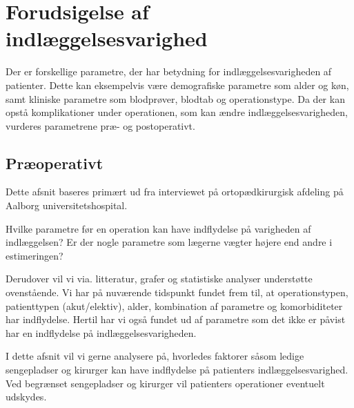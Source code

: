 \section{Forudsigelse af indlæggelsesvarighed}
Der er forskellige parametre, der har betydning for indlæggelsesvarigheden af patienter. Dette kan eksempelvis være demografiske parametre som alder og køn, samt kliniske parametre som blodprøver, blodtab og operationstype. Da der kan opstå komplikationer under operationen, som kan ændre indlæggelsesvarigheden, vurderes parametrene præ- og postoperativt.

\subsection{Præoperativt}

Dette afsnit baseres primært ud fra interviewet på ortopædkirurgisk afdeling på Aalborg universitetshospital. 


Hvilke parametre før en operation kan have indflydelse på varigheden af indlæggelsen? Er der nogle parametre som lægerne vægter højere end andre i estimeringen? 


Derudover vil vi via. litteratur, grafer og statistiske analyser understøtte ovenstående. Vi har på nuværende tidspunkt fundet frem til, at operationstypen, patienttypen (akut/elektiv), alder,  kombination af parametre og komorbiditeter har indflydelse. Hertil har vi også fundet ud af parametre som det ikke er påvist har en indflydelse på indlæggelsesvarigheden.


I dette afsnit vil vi gerne analysere på, hvorledes faktorer såsom ledige sengepladser og kirurger kan have indflydelse på patienters indlæggelsesvarighed. Ved begrænset sengepladser og kirurger vil patienters operationer eventuelt udskydes. 


